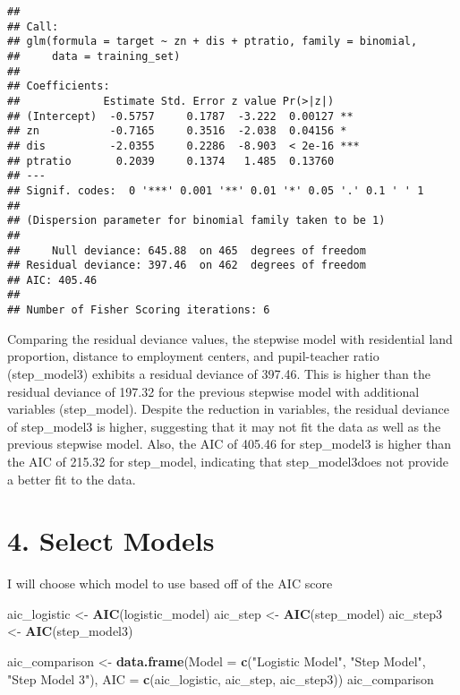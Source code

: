 \documentclass[
]{article}
\newenvironment{Shaded}{\begin{snugshade}}{\end{snugshade}}
\newcommand{\AttributeTok}[1]{\textcolor[rgb]{0.13,0.29,0.53}{#1}}
\newcommand{\FunctionTok}[1]{\textcolor[rgb]{0.13,0.29,0.53}{\textbf{#1}}}
\newcommand{\NormalTok}[1]{#1}
\newcommand{\OtherTok}[1]{\textcolor[rgb]{0.56,0.35,0.01}{#1}}
\newcommand{\StringTok}[1]{\textcolor[rgb]{0.31,0.60,0.02}{#1}}
\begin{document}
\begin{verbatim}
## 
## Call:
## glm(formula = target ~ zn + dis + ptratio, family = binomial, 
##     data = training_set)
## 
## Coefficients:
##             Estimate Std. Error z value Pr(>|z|)    
## (Intercept)  -0.5757     0.1787  -3.222  0.00127 ** 
## zn           -0.7165     0.3516  -2.038  0.04156 *  
## dis          -2.0355     0.2286  -8.903  < 2e-16 ***
## ptratio       0.2039     0.1374   1.485  0.13760    
## ---
## Signif. codes:  0 '***' 0.001 '**' 0.01 '*' 0.05 '.' 0.1 ' ' 1
## 
## (Dispersion parameter for binomial family taken to be 1)
## 
##     Null deviance: 645.88  on 465  degrees of freedom
## Residual deviance: 397.46  on 462  degrees of freedom
## AIC: 405.46
## 
## Number of Fisher Scoring iterations: 6
\end{verbatim}

Comparing the residual deviance values, the stepwise model with
residential land proportion, distance to employment centers, and
pupil-teacher ratio (step\_model3) exhibits a residual deviance of
397.46. This is higher than the residual deviance of 197.32 for the
previous stepwise model with additional variables (step\_model). Despite
the reduction in variables, the residual deviance of step\_model3 is
higher, suggesting that it may not fit the data as well as the previous
stepwise model. Also, the AIC of 405.46 for step\_model3 is higher than
the AIC of 215.32 for step\_model, indicating that step\_model3does not
provide a better fit to the data.

\hypertarget{select-models}{%
\section{4. Select Models}\label{select-models}}

I will choose which model to use based off of the AIC score

\begin{Shaded}
\begin{Highlighting}[]
\NormalTok{aic\_logistic }\OtherTok{\textless{}{-}} \FunctionTok{AIC}\NormalTok{(logistic\_model)}
\NormalTok{aic\_step }\OtherTok{\textless{}{-}} \FunctionTok{AIC}\NormalTok{(step\_model)}
\NormalTok{aic\_step3 }\OtherTok{\textless{}{-}} \FunctionTok{AIC}\NormalTok{(step\_model3)}

\NormalTok{aic\_comparison }\OtherTok{\textless{}{-}} \FunctionTok{data.frame}\NormalTok{(}\AttributeTok{Model =} \FunctionTok{c}\NormalTok{(}\StringTok{"Logistic Model"}\NormalTok{, }\StringTok{"Step Model"}\NormalTok{, }\StringTok{"Step Model 3"}\NormalTok{),}
                             \AttributeTok{AIC =} \FunctionTok{c}\NormalTok{(aic\_logistic, aic\_step, aic\_step3))}
\NormalTok{aic\_comparison}
\end{Highlighting}
\end{Shaded}
\end{document}
